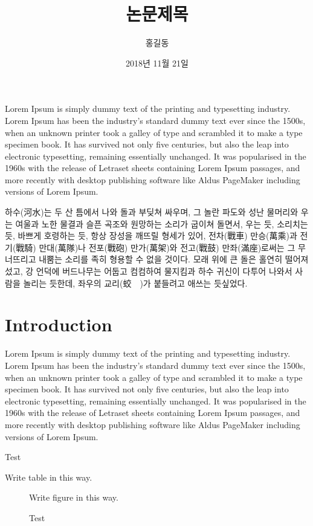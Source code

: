 \documentclass{thesis-SJ}
\title[English title]{논문제목}
\author[洪吉東]{홍길동}{Hong, Gil Dong}
\date{2018년 11월 21일}{November 21st, 2018}
\begin{document}
	\EnglishAbstract
	Lorem Ipsum is simply dummy text of the printing and typesetting industry. Lorem Ipsum has been the industry's standard dummy text ever since the 1500s, when an unknown printer took a galley of type and scrambled it to make a type specimen book. It has survived not only five centuries, but also the leap into electronic typesetting, remaining essentially unchanged. It was popularised in the 1960s with the release of Letraset sheets containing Lorem Ipsum passages, and more recently with desktop publishing software like Aldus PageMaker including versions of Lorem Ipsum.

	
	\KoreanAbstract
	하수(河水)는 두 산 틈에서 나와 돌과 부딪쳐 싸우며, 그 놀란 파도와 성난 물머리와 우는 여울과 노한 물결과 슬픈 곡조와 원망하는 소리가 굽이쳐 돌면서, 우는 듯, 소리치는 듯, 바쁘게 호령하는 듯, 항상 장성을 깨뜨릴 형세가 있어, 전차(戰車) 만승(萬乘)과 전기(戰騎) 만대(萬隊)나 전포(戰砲) 만가(萬架)와 전고(戰鼓) 만좌(滿座)로써는 그 무너뜨리고 내뿜는 소리를 족히 형용할 수 없을 것이다. 모래 위에 큰 돌은 홀연히 떨어져 섰고, 강 언덕에 버드나무는 어둡고 컴컴하여 물지킴과 하수 귀신이 다투어 나와서 사람을 놀리는 듯한데, 좌우의 교리(蛟　)가 붙들려고 애쓰는 듯싶었다.
	
	
	\tableofcontents
	
	\mainpartstart
	
	
	\chapter{Introduction} 
	
	Lorem Ipsum is simply dummy text of the printing and typesetting industry. Lorem Ipsum has been the industry's standard dummy text ever since the 1500s, when an unknown printer took a galley of type and scrambled it to make a type specimen book. It has survived not only five centuries, but also the leap into electronic typesetting, remaining essentially unchanged. It was popularised in the 1960s with the release of Letraset sheets containing Lorem Ipsum passages, and more recently with desktop publishing software like Aldus PageMaker including versions of Lorem Ipsum.
	
	\begin{table}
		\caption{Test}
		Write table in this way. 
	\end{table}
	
	
	\begin{figure}
		Write figure in this way. 
		\caption{Test}
	\end{figure}
	
\end{document}

